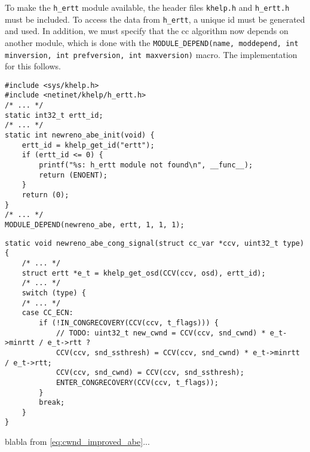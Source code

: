 To make the \lstinline{h_ertt} module available, the header files \lstinline{khelp.h} and \lstinline{h_ertt.h} must be included. To access the data from \lstinline{h_ertt}, a unique id  must be generated and used. In addition, we must specify that the \gls{cc} algorithm now depends on another module, which is done with the \lstinline{MODULE_DEPEND(name, moddepend, int minversion, int prefversion, int maxversion)} macro. The implementation for this follows.

\begin{verbatim}
#include <sys/khelp.h>
#include <netinet/khelp/h_ertt.h>
/* ... */
static int32_t ertt_id;
/* ... */
static int newreno_abe_init(void) {
	ertt_id = khelp_get_id("ertt");
	if (ertt_id <= 0) {
		printf("%s: h_ertt module not found\n", __func__);
		return (ENOENT);
	}
	return (0);
}
/* ... */
MODULE_DEPEND(newreno_abe, ertt, 1, 1, 1);
\end{verbatim}


\begin{verbatim}
static void newreno_abe_cong_signal(struct cc_var *ccv, uint32_t type) {
    /* ... */
    struct ertt *e_t = khelp_get_osd(CCV(ccv, osd), ertt_id);
    /* ... */
    switch (type) {
    /* ... */
    case CC_ECN:
        if (!IN_CONGRECOVERY(CCV(ccv, t_flags))) {
            // TODO: uint32_t new_cwnd = CCV(ccv, snd_cwnd) * e_t->minrtt / e_t->rtt ?
            CCV(ccv, snd_ssthresh) = CCV(ccv, snd_cwnd) * e_t->minrtt / e_t->rtt;
            CCV(ccv, snd_cwnd) = CCV(ccv, snd_ssthresh);
            ENTER_CONGRECOVERY(CCV(ccv, t_flags));
        }
        break;
    }
}
\end{verbatim}
blabla from  \ref{eq:cwnd_improved_abe}...

